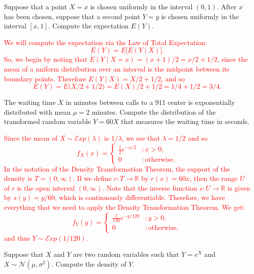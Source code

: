 \documentclass[12pt,reqno]{amsart}
\begin{document}
\prob Suppose that a point $X=x$ is chosen uniformly in the interval $(0,1)$. After $x$ has been chosen, suppose that a second point $Y=y$ is chosen uniformly in the interval $[x,1]$. Compute the expectation $E(Y)$.

\bigskip
\textcolor{red}{We will compute the expectation via the Law of Total Expectation:
	\[E(Y) = E \big[ E(Y\mid X) \big].
	\]
So, we begin by noting that $E(Y\mid X=x) = (x+1)/2 = x/2 + 1/2$, since the mean of a uniform distribution over an interval is the midpoint between its boundary points. Therefore $E(Y\mid X) = X/2 + 1/2$, and so
	\[E(Y) = E\big( X/2 + 1/2\big) = E(X) /2 + 1/2 = 1/4 + 1/2 = 3/4.
	\]}
\bigskip










\prob The waiting time $X$ in minutes between calls to a 911 center is exponentially distributed with mean $\mu = 2$ minutes. Compute the distribution of the transformed random variable $Y=60X$ that measures the waiting time in seconds.

\bigskip
\textcolor{red}{Since the mean of $X\sim \mathcal{E}xp(\lambda)$ is $1/\lambda$, we see that $\lambda = 1/2$ and so
	\[f_X(x) = \begin{cases}
	\frac{1}{2} e^{-x/2} & : x>0, \\
	0 & : \text{otherwise}.
	\end{cases}
	\]
In the notation of the Density Transformation Theorem, the support of the density is $T = (0,\infty)$. If we define $r:T\to \mathbb{R}$ by $r(x) = 60x$, then the range $U$ of $r$ is the open interval $(0,\infty)$. Note that the inverse function $s:U\to \mathbb{R}$ is given by $s(y) = y/60$, which is continuously differentiable. Therefore, we have everything that we need to apply the Density Transformation Theorem. We get:
	\[f_Y(y) = \begin{cases}
	\frac{1}{120} e^{-y/120} & : y>0, \\
	0 & : \text{otherwise},
	\end{cases}
	\]
and thus $Y \sim \mathcal{E}xp(1/120)$.}
\bigskip












\prob Suppose that $X$ and $Y$ are two random variables such that $Y=e^X$ and $X\sim \mathcal{N}(\mu,\sigma^2)$. Compute the density of $Y$.
\end{document}
